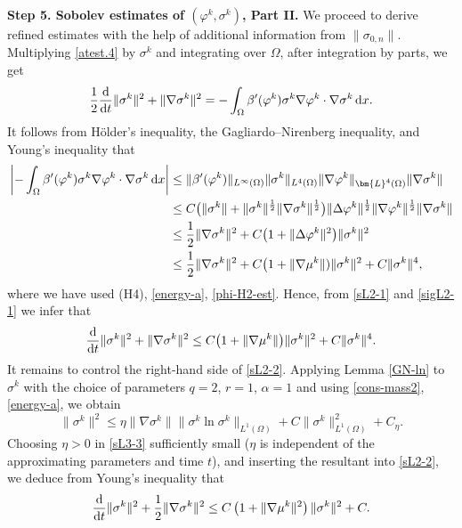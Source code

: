 \documentclass[11pt,reqno]{amsart}
\def\d{{\rm d}}
\def\ddt{\frac{\d}{\d t}}
\begin{document}
\textbf{Step 5. Sobolev estimates of $(\varphi^k, \sigma^k)$, Part II.}
We proceed to derive refined estimates with the help of additional information from $\|\sigma_{0,n}\|$. Multiplying \eqref{atest.4} by $\sigma^k$ and integrating over $\Omega$, after integration by parts, we get
%
\begin{equation}
\label{sL2-1}
\frac12 \ddt \|\sigma^k \|^2 + \|\nabla \sigma^k \|^2
=-\int_{\Omega} \beta'(\varphi^k) \sigma^k \nabla \varphi^k \cdot \nabla \sigma^k \, \d x.
\end{equation}
%
It follows from H\"{o}lder's inequality, the Gagliardo--Nirenberg inequality, and Young's inequality that
%
\begin{align}
 \left|-\int_{\Omega} \beta'(\varphi^k) \sigma^k \nabla \varphi^k \cdot \nabla \sigma^k \, \d x\right|
& \leq  \|\beta'(\varphi^k)\|_{L^\infty(\Omega)}
\|\sigma^k\|_{L^4(\Omega)}\|\nabla \varphi^k\|_{\bm{L}^4(\Omega)}\|\nabla \sigma^k\|
 \notag \\
& \leq C \big(\|\sigma^k\| + \|\sigma^k\|^\frac12\|\nabla\sigma^k\|^\frac12\big)\|\Delta \varphi^k\|^\frac12\|\nabla \varphi^k\|^\frac12 \|\nabla \sigma^k\|
\notag\\
& \leq  \frac{1}{2}\|\nabla \sigma^k\|^2
+ C \big(1+\|\Delta \varphi^k\|^2\big)\|\sigma^k\|^2
\notag \\
&\leq \frac{1}{2}\|\nabla \sigma^k\|^2
+ C \big(1+\|\nabla \mu^k\|)\|\sigma^k\|^2 + C\|\sigma^k\|^4,
\label{sigL2-1}
\end{align}
%
where we have used (H4), \eqref{energy-a}, \eqref{phi-H2-est}. Hence, from \eqref{sL2-1} and \eqref{sigL2-1} we infer that
%
\begin{equation}
\label{sL2-2}
  \ddt \|\sigma^k \|^2 + \|\nabla \sigma^k \|^2
\leq C \big(1+\|\nabla \mu^k\|\big) \|\sigma^k\|^2
+ C\|\sigma^k\|^4.
\end{equation}
%
It remains to control the right-hand side of \eqref{sL2-2}.
Applying Lemma \ref{GN-ln} to $\sigma^k$ with the choice of parameters $q=2$, $r=1$, $\alpha=1$ and using \eqref{cons-mass2}, \eqref{energy-a}, we obtain
%
\begin{equation}
\label{sL3-3}
\| \sigma^k\|^2
\leq \eta \| \nabla \sigma^k\|\|\sigma^k\ln \sigma^k\|_{L^1(\Omega)}+ C\|\sigma^k\|^2_{L^1(\Omega)}+C_\eta.
\end{equation}
%
Choosing $\eta>0$ in \eqref{sL3-3} sufficiently small ($\eta$ is independent of the approximating parameters and time $t$), and inserting the resultant into \eqref{sL2-2}, we deduce from Young's inequality that
%
\begin{equation}
\label{sL2-4}
\begin{split}
  \ddt \|\sigma^k \|^2 + \frac12 \|\nabla \sigma^k \|^2
\leq C \left( 1+ \| \nabla \mu^k\|^2 \right) \| \sigma^k\|^2 +C.
\end{split}
\end{equation}
\end{document}
